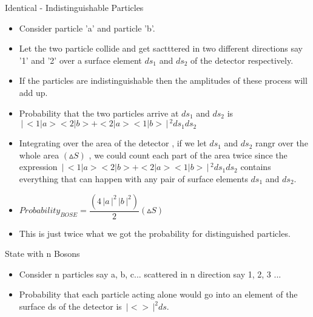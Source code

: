 \documentclass[aspectratio=169]{beamer}
\begin{document}
\begin{frame}{Identical - Indistinguishable Particles}

	\begin{itemize}
	
		\item Consider particle 'a' and particle 'b'. \newline
		\item Let the two particle collide and get sactttered in two different directions say '1' and '2' over a surface element $ds_{1}$ and $ds_{2}$ of the detector respectively. \newline
		\item If the particles are indistinguishable then the amplitudes of these process will add up. \newline
		\item Probability that the two particles arrive at $ds_{1}$ and $ds_{2}$ is \newline
		$\,\Bigr\rvert\,<1|a><2|b> + <2|a><1|b>\,\Bigr\rvert\,^{2} ds_{1} ds_{2}$
		
	\end{itemize}
	
\end{frame}

\begin{frame}

	\begin{itemize}
	
		\item Integrating over the area of the detector ,  if we let $ds_{1}$ and $ds_{2}$ rangr over the whole area $(\vartriangle S)$ , we could count each part of the area twice since the expression $\,\Bigr\rvert\,<1|a><2|b> + <2|a><1|b>\,\Bigr\rvert\,^{2} ds_{1} ds_{2}$ contains everything that can happen with any pair of surface elements $ds_{1}$ and $ds_{2}$. \newline
		\item $ Probability_{BOSE} = \dfrac{ \left(4\,\Bigr\rvert a \,\Bigr\rvert^{2} \,\Bigr\rvert b \,\Bigr\rvert^{2}\right)}{2} \left(\vartriangle S\right)$ \newline
		\item This is just twice what we got the probability for distinguished particles. 

	\end{itemize}
	
\end{frame}

\begin{frame}{State with n Bosons}

	\begin{itemize}
	
		\item Consider n particles say a, b, c... scattered in n direction say 1, 2, 3 ... \newline
		\item Probability that each particle acting alone would go into an element of the surface ds of the detector is $\,\Bigr\rvert < >\,\Bigr\rvert^{2} ds$. 
		
	\end{itemize}
	
\end{frame} 
\end{document}
